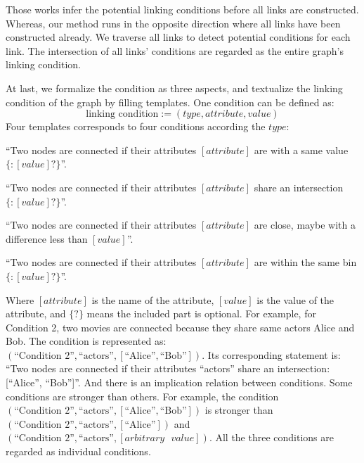 Those works infer the potential linking conditions before all links are constructed. 
Whereas, our method runs in the opposite direction where all links have been constructed already.
We traverse all links to detect potential conditions for each link.
The intersection of all links' conditions are regarded as the entire graph's linking condition.

At last, we formalize the condition as three aspects, and textualize the linking condition of the graph by filling templates. 
One condition can be defined as:
\begin{equation}
    \text{linking condition} := ( type, attribute, value )
\end{equation}
Four templates corresponds to four conditions according the $type$:

\begin{compactenum}
    \item ``Two nodes are connected if their attributes $[{attribute}]$ are with a same value$\{: [{value}]?\}$''.
    \item ``Two nodes are connected if their attributes $[{attribute}]$ share an intersection$\{: [{value}]?\}$''.
    \item ``Two nodes are connected if their attributes $[{attribute}]$ are close, maybe with a difference less than $[{value}]$''.
    \item ``Two nodes are connected if their attributes $[{attribute}]$ are within the same bin$\{: [{value}]?\}$''.
\end{compactenum}

Where $[{attribute}]$ is the name of the attribute, $[{value}]$ is the value of the attribute, and $\{?\}$ means the included part is optional. 
For example, for Condition 2, two movies are connected because they share same actors Alice and Bob. 
The condition is represented as: $(\text{``Condition 2''}, \text{``actors''}, [\text{``Alice''}, \text{``Bob''}])$. 
Its corresponding statement is: ``Two nodes are connected if their attributes ``actors'' share an intersection: [``Alice'', ``Bob'']''. 
And there is an implication relation between conditions.
Some conditions are stronger than others.
For example, the condition $(\text{``Condition 2''}, \text{``actors''}, [\text{``Alice''}, \text{``Bob''}])$ is stronger than $(\text{``Condition 2''}, \text{``actors''}, [\text{``Alice''}])$ and $(\text{``Condition 2''}, \text{``actors''}, [arbitrary\text{ }value])$.
All the three conditions are regarded as individual conditions.

